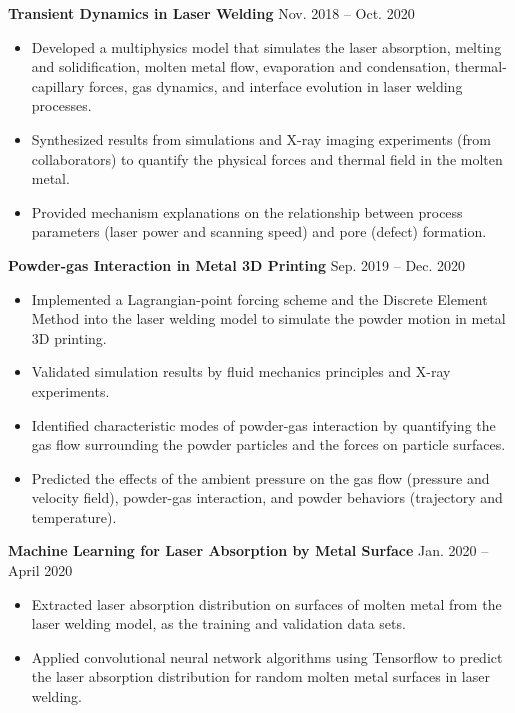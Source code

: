 \documentclass[11pt, letterpaper]{article}
\begin{document}
\textbf{Transient Dynamics in Laser Welding} \hfill Nov. 2018 -- Oct. 2020
\begin{itemize}[leftmargin=*, labelsep=5mm]
   \item Developed a multiphysics model that simulates the laser absorption, melting and
      solidification, molten metal flow, evaporation and condensation, thermal-capillary forces, gas
      dynamics, and interface evolution in laser welding processes.
   \item Synthesized results from simulations and X-ray imaging experiments (from collaborators) to
      quantify the physical forces and thermal field in the molten metal.
   \item Provided mechanism explanations on the relationship between process parameters (laser power
      and scanning speed) and pore (defect) formation.
\end{itemize}

\vspace{3pt}
\textbf{Powder-gas Interaction in Metal 3D Printing} \hfill Sep. 2019 -- Dec. 2020
\begin{itemize}[leftmargin=*, labelsep=5mm]
   \item Implemented a Lagrangian-point forcing scheme and the Discrete Element Method
      into the laser welding model to simulate the powder motion in metal 3D printing.
   \item Validated simulation results by fluid mechanics principles and X-ray experiments.
   \item Identified characteristic modes of powder-gas interaction by quantifying the gas flow
      surrounding the powder particles and the forces on particle surfaces.
   \item Predicted the effects of the ambient pressure on the gas flow (pressure and velocity
      field), powder-gas interaction, and powder behaviors (trajectory and temperature).
\end{itemize}

\vspace{3pt}

\textbf{Machine Learning for Laser Absorption by Metal Surface} \hfill Jan. 2020 -- April 2020
\begin{itemize}[leftmargin=*, labelsep=5mm]
   \item Extracted laser absorption distribution on surfaces of molten metal from the laser welding
      model, as the training and validation data sets.
   \item Applied convolutional neural network algorithms using Tensorflow to predict the laser
      absorption distribution for random molten metal surfaces in laser welding.
\end{itemize}
\end{document}

